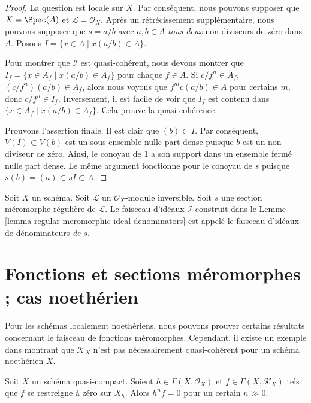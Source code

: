 \begin{proof}
La question est locale sur  $X$. Par conséquent, nous pouvons supposer que
 $X = \Spec(A)$ et  $\mathcal{L} = \mathcal{O}_X$. Après un rétrécissement supplémentaire, nous pouvons
supposer que  $s = a/b$  avec  $a, b \in A$   {\it  tous deux
}  non-diviseurs de zéro dans  $A$. Posons  $I = \{x \in A \mid x(a/b) \in A\}$.

\medskip\noindent
Pour montrer que  $\mathcal{I}$  est quasi-cohérent, nous devons montrer que
 $I_f = \{x \in A_f \mid x(a/b) \in A_f\}$  pour chaque  $f \in A$. Si  $c/f^n \in A_f$,  $(c/f^n)(a/b) \in A_f$, alors nous
voyons que  $f^mc(a/b) \in A$  pour certains  $m$, donc  $c/f^n \in I_f$.
Inversement, il est facile de voir que  $I_f$  est contenu dans  $\{x \in A_f \mid x(a/b) \in A_f\}$.
Cela prouve la quasi-cohérence.

\medskip\noindent
Prouvons l'assertion finale. Il est clair que  $(b) \subset I$. Par conséquent,
 $V(I) \subset V(b)$  est un sous-ensemble nulle part dense puisque  $b$  est un
non-diviseur de zéro. Ainsi, le conoyau de  $1$  a son support dans un
ensemble fermé nulle part dense. Le même argument fonctionne pour le conoyau de
 $s$  puisque  $s(b) = (a) \subset sI \subset A$.
\end{proof}

\begin{definition}
\label{definition-regular-meromorphic-ideal-denominators}
Soit  $X$  un schéma. Soit  $\mathcal{L}$  un  $\mathcal{O}_X$-module inversible.
Soit  $s$  une section méromorphe régulière de  $\mathcal{L}$. Le faisceau
d'idéaux  $\mathcal{I}$  construit dans le Lemme  \ref{lemma-regular-meromorphic-ideal-denominators}  est appelé le faisceau
d'idéaux de dénominateurs  {\it  de  $s$}.
\end{definition}




\section{Fonctions et sections méromorphes ; cas noethérien}
\label{section-meromorphic-noetherian}

\noindent
Pour les schémas localement noethériens, nous pouvons prouver certains résultats
concernant le faisceau de fonctions méromorphes. Cependant, il existe un exemple
dans  \cite{misconceptions}  montrant que  $\mathcal{K}_X$  n'est pas nécessairement quasi-cohérent
pour un schéma noethérien  $X$.

\begin{lemma}
\label{lemma-meromorphic-section-restricts-to-zero}
Soit  $X$  un schéma quasi-compact. Soient  $h \in \Gamma(X, \mathcal{O}_X)$  et  $f \in \Gamma(X, \mathcal{K}_X)$ 
tels que  $f$  se restreigne à zéro sur  $X_h$. Alors  $h^n f = 0$ 
pour un certain  $n \gg 0$.
\end{lemma}

